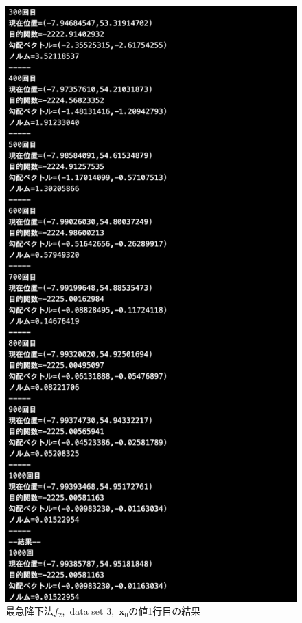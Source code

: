 \documentclass[12pt]{jarticle}
\begin{document}
\begin{figure}[h]
\begin{minipage}{0.5\hsize}
    \end{minipage}
    \begin{minipage}{0.5\hsize}
        \begin{center}
            \includegraphics[scale=0.2]{kadai1_2s_out3_1_3.png}
        \end{center}
    \end{minipage}
    \caption{最急降下法$f_2$,\ data set 3,\ $\boldsymbol{x}_0$の値1行目の結果}
\end{figure}
\end{document}
